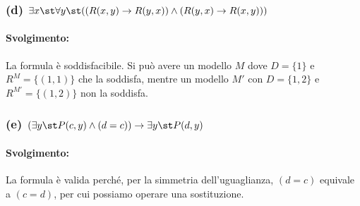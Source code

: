 \subsubsection*{(d) \(\exists x\st \forall y\st ((R(x,y)\rightarrow R(y,x))\wedge(R(y,x)\rightarrow R(x,y)))\)}
\paragraph{Svolgimento:}
La formula è soddisfacibile. Si può avere un modello \(M\) dove \(D=\{1\}\) e \(R^M=\{(1,1)\}\) che la soddisfa, mentre un modello \(M'\) con \(D=\{1,2\}\) e \(R^{M'}=\{(1,2)\}\) non la soddisfa. 

\subsubsection*{(e) \((\exists y\st P(c,y)\wedge(d=c))\rightarrow\exists y\st P(d,y)\)}
\paragraph{Svolgimento:}
La formula è valida perché, per la simmetria dell'uguaglianza, \((d=c)\) equivale a \((c=d)\), per cui possiamo operare una sostituzione. 

\begin{prooftree}
  \small
  
  
  
  


\end{prooftree}